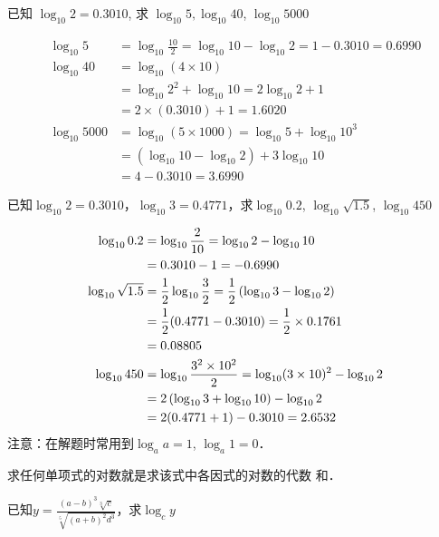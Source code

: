 \begin{example}
已知 $\log _{10} 2=0.3010$, 求 $\log_{10} 5, \log_{10} 40$,
    $\log_{10} 5000$
\end{example}

\begin{solution}
\[\begin{split}
  \log _{10} 5&=\log _{10} \frac{10}{2}=\log _{10} 10-\log _{10} 2=1-0.3010=0.6990 \\
   \log _{10} 40&=\log_{10}(4 \times 10)\\
   &=\log_{10} 2^{2}+\log_{10} 10=2 \log_{10} 2+1\\
    &=2 \times(0.3010)+1=1.6020\\
    \log _{10} 5000&=\log _{10}(5 \times 1000)=\log _{10} 5+\log _{10} 10^{3}\\
    &=\left(\log_{10} 10-\log_{10} 2\right)+3 \log _{10} 10\\
    &=4-0.3010=3.6990
\end{split}\]
\end{solution}


\begin{example}
已知$\log_{10}2=0.3010$，$\log_{10}3=0.4771$，求$\log _{10} 0.2$, $\log _{10} \sqrt{1.5}$, $\log _{10} 450$
\end{example}    

\begin{solution}
    \[\begin{split}
        \log _{10} 0.2 &=\log _{10} \dfrac{2}{10}=\log _{10} 2-\log _{10} 10\\ 
        &=0.3010-1 =-0.6990\\
        \log _{10} \sqrt{1.5} &=\dfrac{1}{2} \log _{10} \dfrac{3}{2}=\dfrac{1}{2}\left(\log _{10} 3-\log _{10} 2\right)\\
        &=\dfrac{1}{2}(0.4771-0.3010)=\dfrac{1}{2}\times 0.1761\\
        &=0.08805\\
        \log _{10} 450 &=\log_{10}\dfrac{3^2\times 10^2}{2}=\log_{10}(3\times 10)^2-\log_{10} 2\\
        &=2\left(\log_{10}3+\log_{10}10\right) -\log_{10}2\\
        &=2(0.4771+1)-0.3010=2.6532
\end{split}\]
注意：在解题时常用到$\log_a a=1$, $\log_a 1=0$．
\end{solution}    

求任何单项式的对数就是求该式中各因式的对数的代数
和．
    
\begin{example}
    已知$y=\frac{(a-b)^3\sqrt[3]{c}}{\sqrt[5]{(a+b)^2d^3}}$，求$\log_c y$
\end{example}

